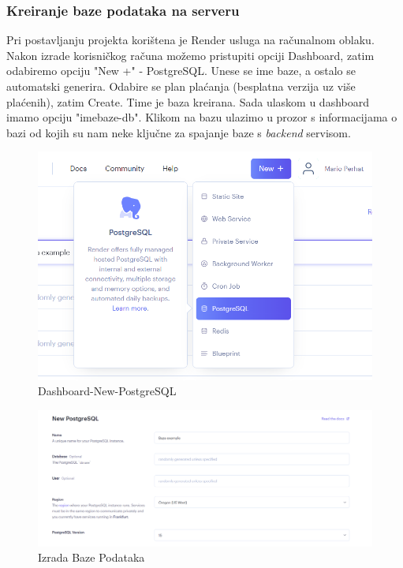 			\subsubsection{Kreiranje baze podataka na serveru}
			Pri postavljanju projekta korištena je Render usluga na računalnom oblaku. Nakon izrade korisničkog računa možemo pristupiti opciji Dashboard, zatim odabiremo opciju "New +" - PostgreSQL. Unese se ime baze, a ostalo se automatski generira. Odabire se plan plaćanja (besplatna verzija uz više plaćenih), zatim Create. Time je baza kreirana. Sada ulaskom u dashboard imamo opciju "imebaze-db". Klikom na bazu ulazimo u prozor s informacijama o bazi od kojih su nam neke ključne za spajanje baze s \textit{backend} servisom.
			\newpage
			\begin{figure} [h]
				\includegraphics[width=\linewidth]{Slike/Dashboard-New-PostgreSQL}
				\caption{Dashboard-New-PostgreSQL}
			\end{figure}
			\newpage
			\begin{figure} [h]
				\includegraphics[width=\linewidth]{Slike/Izrada Baze Podataka}
				\caption{Izrada Baze Podataka}
			\end{figure}
